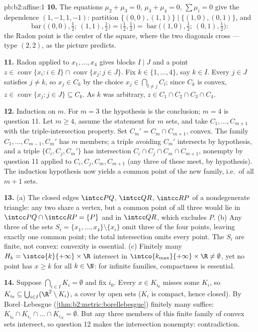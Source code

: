 \begin{solution}{pb:b2:affine:1}
\textbf{10.} The equations $\mu_2 + \mu_3 = 0$, $\mu_3 +
\mu_4 = 0$, $\sum\mu_i = 0$ give the dependence $(1, -1, 1,
-1)$: partition $\{(0,0), (1,1)\} \mid \{(1,0), (0,1)\}$, and
\[
\operatorname{bar}\bigl((0,0), \tfrac12;\ (1,1),
\tfrac12\bigr) = \bigl(\tfrac12, \tfrac12\bigr) =
\operatorname{bar}\bigl((1,0), \tfrac12;\ (0,1),
\tfrac12\bigr) :
\]
the Radon point is the center of the square, where the two
diagonals cross --- type $(2,2)$, as the picture predicts.

\textbf{11.} Radon applied to $x_1, \dots, x_4$ gives blocks
$I \mid J$ and a point $z \in \operatorname{conv}\{x_i : i
\in I\} \cap \operatorname{conv}\{x_j : j \in J\}$. Fix $k
\in \{1, \dots, 4\}$, say $k \in I$. Every $j \in J$
satisfies $j \neq k$, so $x_j \in C_k$ by the choice $x_j \in
\bigcap_{l \neq j}C_l$; since $C_k$ is convex, $z \in
\operatorname{conv}\{x_j : j \in J\} \subseteq C_k$. As $k$
was arbitrary, $z \in C_1 \cap C_2 \cap C_3 \cap C_4$.

\textbf{12.} Induction on $m$. For $m = 3$ the hypothesis is
the conclusion; $m = 4$ is question 11. Let $m \geq 4$,
assume the statement for $m$ sets, and take $C_1, \dots,
C_{m+1}$ with the triple-intersection property. Set $C_m' =
C_m \cap C_{m+1}$, convex. The family $C_1, \dots, C_{m-1},
C_m'$ has $m$ members; a triple avoiding $C_m'$ intersects by
hypothesis, and a triple $\{C_i, C_j, C_m'\}$ has
intersection $C_i \cap C_j \cap C_m \cap C_{m+1}$, nonempty
by question 11 applied to $C_i, C_j, C_m, C_{m+1}$ (any three
of these meet, by hypothesis). The induction hypothesis now
yields a common point of the new family, i.e.\ of all $m+1$
sets.

\textbf{13.} (a) The closed edges $\intcc PQ$, $\intcc QR$,
$\intcc RP$ of a nondegenerate triangle: any two share a
vertex, but a common point of all three would lie in $\intcc
PQ \cap \intcc RP = \{P\}$ and in $\intcc QR$, which excludes
$P$. (b) Any three of the sets $S_i = \{x_1, \dots, x_4\}
\setminus \{x_i\}$ omit three of the four points, leaving
exactly one common point; the total intersection omits every
point. The $S_i$ are finite, not convex: convexity is
essential. (c) Finitely many $H_k = \intco{k}{+\infty} \times
\R$ intersect in $\intco{k_{\max}}{+\infty} \times \R \neq
\emptyset$, yet no point has $x \geq k$ for all $k \in \N$:
for infinite families, compactness is essential.

\textbf{14.} Suppose $\bigcap_{i \in I}K_i = \emptyset$ and
fix $i_0$. Every $x \in K_{i_0}$ misses some $K_i$, so
$K_{i_0} \subseteq \bigcup_{i \in I}(\R^2 \setminus K_i)$, a
cover by open sets ($K_i$ is compact, hence closed). By
Borel--Lebesgue (\cref{thm:b2:metric:borellebesgue}) finitely
many suffice: $K_{i_0} \cap K_{i_1} \cap \dots \cap K_{i_N} =
\emptyset$. But any three members of this finite family of
convex sets intersect, so question 12 makes the intersection
nonempty: contradiction.


\end{solution}
